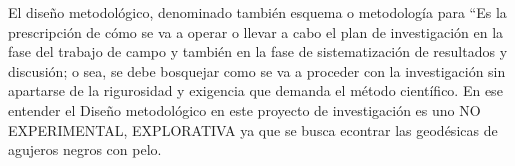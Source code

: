 \documentclass[../Main.tex]{subfiles}
\begin{document}
El diseño metodológico, denominado también esquema o metodología para “Es la prescripción de cómo se va a operar o llevar a cabo el plan de investigación en la fase del trabajo de campo y también en la fase de sistematización de resultados y discusión; o sea, se debe bosquejar como se va a proceder con la investigación sin apartarse de la rigurosidad y exigencia que demanda el método científico. En ese entender el Diseño metodológico en este proyecto de investigación es uno NO EXPERIMENTAL, EXPLORATIVA ya que se busca econtrar las geodésicas de agujeros negros con pelo.
\biblio %
\end{document}
